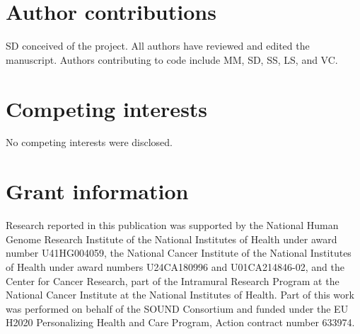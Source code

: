 \documentclass[9pt,a4paper]{extarticle}\usepackage[]{graphicx}\usepackage[]{color}
\begin{document}
\section*{Author contributions}
SD conceived of the project. All authors have reviewed and edited the manuscript. Authors contributing to code include MM, SD, SS, LS, and VC.


\section*{Competing interests}
No competing interests were disclosed.

\section*{Grant information}

Research reported in this publication was supported by the National
Human Genome Research Institute of the National Institutes of Health
under award number U41HG004059, the National Cancer Institute of the
National Institutes of Health under award numbers U24CA180996 and
U01CA214846-02, and the Center for Cancer Research, part of the
Intramural Research Program at the National Cancer Institute at the
National Institutes of Health. Part of this work was performed on
behalf of the SOUND Consortium and funded under the EU H2020
Personalizing Health and Care Program, Action contract number 633974.



%
%
%
%
%
%
%

\end{document}
